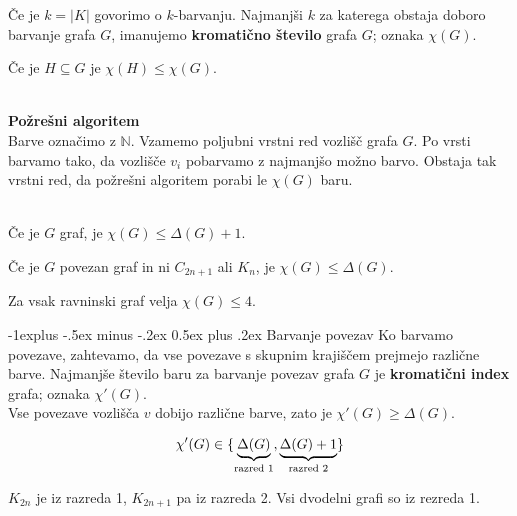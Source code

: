 \documentclass[a4paper,9pt]{extarticle}
\makeatletter
\renewcommand{\subsection}{\@startsection{subsection}{2}{0mm}%
                                {-1explus -.5ex minus -.2ex}%
                                {0.5ex plus .2ex}%
                                {\normalfont\normalsize\bfseries}}
\makeatother
\begin{document}
\begin{multicols}{3}
Če je $k = |K|$ govorimo o $k$-barvanju. Najmanjši $k$ za katerega obstaja doboro barvanje grafa $G$, imanujemo
\textbf{kromatično število} grafa $G$; oznaka $\chi(G)$.

Če je $H \subseteq G$ je $\chi(H) \leq \chi(G)$.\\\

\textbf{Požrešni algoritem}\\
Barve označimo z $\mathbb{N}$. Vzamemo poljubni vrstni red vozlišč grafa $G$. Po vrsti barvamo tako, da 
vozlišče $v_i$ pobarvamo z najmanjšo možno barvo.
Obstaja tak vrstni red, da požrešni algoritem porabi le $\chi(G)$ baru.\\\

Če je $G$ graf, je $\chi(G) \leq \Delta(G)+1$.

Če je $G$ povezan graf in ni $C_{2n+1}$ ali $K_n$, je $\chi(G) \leq \Delta(G)$.

Za vsak ravninski graf velja $\chi(G) \leq 4$.

\subsection{Barvanje povezav}
Ko barvamo povezave, zahtevamo, da vse povezave s skupnim krajiščem prejmejo različne barve.
Najmanjše število baru za barvanje povezav grafa $G$ je \textbf{kromatični index} grafa; oznaka $\chi'(G)$.\\

Vse povezave vozlišča $v$ dobijo različne barve, zato je $\chi'(G) \geq \Delta(G)$.

\[\chi'(G) \in \{\underbrace{\Delta(G)}_\textmd{razred 1}, \underbrace{\Delta(G)+1}_\textmd{razred 2} \} \]

$K_{2n}$ je iz razreda 1, $K_{2n+1}$ pa iz razreda 2. Vsi dvodelni grafi so iz rezreda 1.
\end{multicols}
\pagebreak
\end{document}
